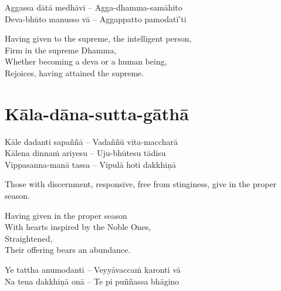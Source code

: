 \begin{twochants}
  Aggassa dātā medhāvī – Agga-dhamma-samāhito\\
  Deva-bhūto manusso vā – Aggappatto pamodatī'ti
\end{twochants}

\begin{english-verses}
  Having given to the supreme, the intelligent person,\\
  Firm in the supreme Dhamma,\\
  Whether becoming a deva or a human being,\\
  Rejoices, having attained the supreme.
\end{english-verses}

\suttaRef{[AN 5.32]}

\section{Kāla-dāna-sutta-gāthā}
\label{kala-dana-sutta-gatha}

 \vspace{-0.6em}

\begin{twochants}
  Kāle dadanti sapaññā – Vadaññū vīta-maccharā\\
  Kālena dinnaṁ ariyesu – Uju-bhūtesu tādisu\\
  Vippasanna-manā tassa – Vipulā hoti dakkhiṇā
\end{twochants}

\vspace{16pt}

\begin{english-verses}
\begin{english-hangtogether}
  Those with discernment, responsive, free from stinginess, give in the proper season.
\end{english-hangtogether}
  Having given in the proper season\\
  With hearts inspired by the Noble Ones,\\
  Straightened,\\
  Their offering bears an abundance.
\end{english-verses}

\begin{twochants}
  Ye tattha anumodanti – Veyyāvaccaṁ karonti vā\\
  Na tena dakkhiṇā onā – Te pi puññassa bhāgino
\end{twochants}

